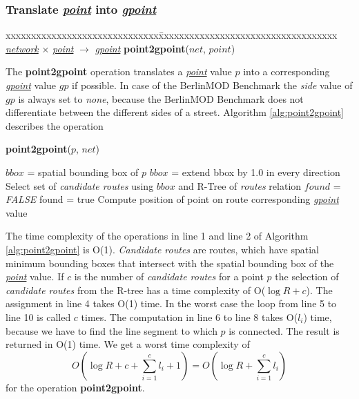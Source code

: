 \documentclass[a4paper]{article}
\newcommand{\bmodb} {BerlinMOD Benchmark}
\newcommand{\op}[1]{\textbf{#1}}
\newcommand{\dt}[1]{\textsl{\underline{#1}}}
\newcommand{\false}{\textsl{FALSE}}
\begin{document}
\subsubsection{Translate \dt{point} into \dt{gpoint}}
\begin{tabbing}
xxxxxxxxxxxxxxxxxxxxxxxxxxxxxx\=xxxxxxxxxxxxxxxxxxxxxxxxxxxxxxxxxxx\kill
\dt{network} $\times$ \dt{point} $\rightarrow$ \dt{gpoint} \>
\op{point2gpoint}($net$, $point$)\\
\end{tabbing}
The \op{point2gpoint} operation translates a \dt{point} value $p$ into a
corresponding \dt{gpoint} value $gp$ if possible. In case of 
the \bmodb{} the \textit{side} value of $gp$ is always set to \textit{none}, because the 
\bmodb{} does not differentiate between the different sides of a street. Algorithm
\ref{alg:point2gpoint} describes the operation 
\begin{algorithm}[H]
  \caption{\op{point2gpoint}($p$, $net$)}
  \label{alg:point2gpoint}
  \begin{algorithmic}[1]
    \STATE $bbox$ = spatial bounding box of $p$
    \STATE $bbox$ = extend bbox by 1.0 in every direction
    \STATE Select set of \textit{candidate routes} using $bbox$ and R-Tree of \textit{routes}
relation
    \STATE $found$ = \false{}
        \STATE found = true
        \STATE Compute position of point on route
      \ENDIF
    \ENDWHILE
    \RETURN corresponding \dt{gpoint} value
  \end{algorithmic}
\end{algorithm}
The time complexity of the operations in line 1 and line 2 of Algorithm 
\ref{alg:point2gpoint} is O(1).
\textit{Candidate routes} are routes, which have spatial minimum bounding boxes 
that intersect with the spatial bounding box of the \dt{point} value. 
If $c$ is the number of \textit{candidate routes} for a point $p$ the selection of 
\textit{candidate routes} from the R-tree has a time complexity of O($\log R + c$).
The assignment in line 4 takes O(1) time.
In the worst case the loop from line 5 to line 10 is called $c$ times.
The computation in line 6 to line 8 takes O($l_i$) time, because
we have to find the line segment to which $p$ is connected.
The result is returned in O(1) time. We get a worst time complexity of
\[O(\log R + c + \sum_{i=1}^{c}{l_i} + 1) = O(\log R + \sum_{i=1}^{c}{l_i})\]
for the operation \op{point2gpoint}.
\end{document}
